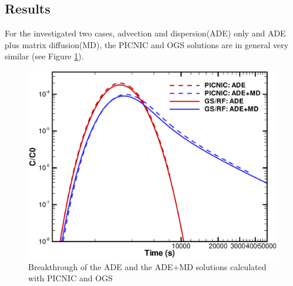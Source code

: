 \subsection{Results}

For the investigated two cases, advection and dispersion(ADE) only
and ADE plus matrix diffusion(MD), the PICNIC and OGS solutions
are in general very similar (see Figure \ref{c:matdiff_result}).

\begin{figure}[!htb]
  \begin{center}
  \includegraphics[scale=0.4]{PART_II/C/fig_matdiff_result.eps}
  \end{center}
  \caption{Breakthrough of the ADE and the ADE+MD solutions calculated with PICNIC and OGS}
  \label{c:matdiff_result}
\end{figure}

\newpage